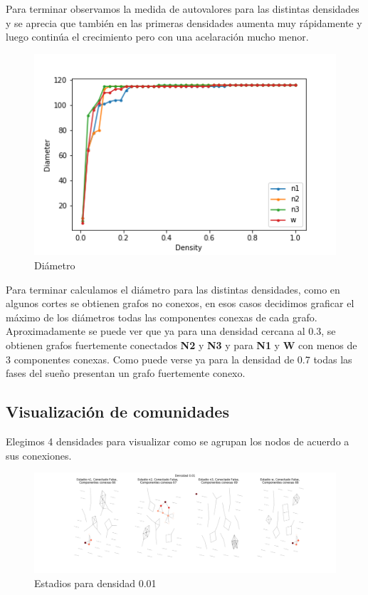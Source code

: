 Para terminar observamos la medida de autovalores para las distintas densidades y se aprecia que también en las primeras densidades aumenta muy rápidamente y luego continúa el crecimiento pero con una acelaración mucho menor.

\begin{figure}[H]
    \centering
    \includegraphics[width = 6in]{img/diameter.png}
    \caption{Diámetro}
    \label{fig:diameter}
\end{figure}

Para terminar calculamos el diámetro para las distintas densidades, como en algunos cortes se obtienen grafos no conexos, en esos casos decidimos graficar el máximo de los diámetros todas las componentes conexas de cada grafo. Aproximadamente se puede ver que ya para una densidad cercana al 0.3, se obtienen grafos fuertemente conectados \textbf{N2} y \textbf{N3} y para \textbf{N1} y \textbf{W} con menos de 3 componentes conexas. Como puede verse ya para la densidad de 0.7 todas las fases del sueño presentan un grafo fuertemente conexo.

\subsection{Visualización de comunidades}
Elegimos 4 densidades para visualizar como se agrupan los nodos de acuerdo a sus conexiones.

\begin{figure}[H]
    \centering
    \includegraphics[width = \textwidth]{img/unweight_graphs_001.png}
    \caption{Estadios para densidad 0.01}
    \label{fig:unweight-001}
\end{figure}

